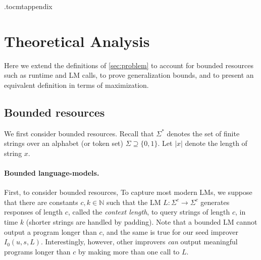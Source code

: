 \documentclass{article}
\newcommand{\sol}{{s}}
\begin{document}
    \etocdepthtag.toc{mtappendix}
    {\small\tableofcontents}

\clearpage
\pagebreak


























\section{Theoretical Analysis}\label{ap:theory}

Here we extend the definitions of \cref{sec:problem} to account for bounded resources such as runtime and LM calls, to prove generalization bounds, and to present an equivalent definition in terms of maximization.

\subsection{Bounded resources}

We first consider bounded resources. Recall that $\Sigma^*$ denotes the set of finite strings over an alphabet (or token set) $\Sigma \supseteq \{0,1\}$. Let $|x|$ denote the length of string $x$. 

\paragraph{Bounded language-models.}
First, to consider bounded resources, To capture most modern LMs, we suppose that there are constants $c, k \in \mathbb{N}$ such that the LM $L:\Sigma^c\rightarrow \Sigma^c$ generates responses of length $c$, called the \textit{context length}, to query strings of length $c$, in time $k$ (shorter strings are handled by padding). 
Note that a bounded LM cannot output a program longer than $c$, and the same is true for our seed improver $I_0(u, \sol, L)$. Interestingly, however, other improvers \textit{can} output meaningful programs longer than $c$ by making more than one call to $L$. 
\end{document}
